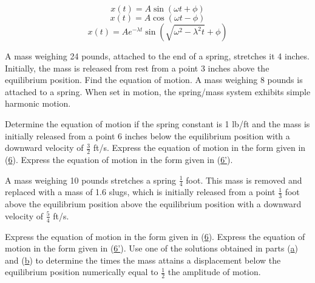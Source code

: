 \documentclass[chapter=5,section=1]{math252homework}
\begin{document}
\renewcommand\theequation{\arabic{equation}}
\setcounter{equation}{5}
\begin{equation} x(t) = A\sin(\omega t + \phi)\label{eq:6}\end{equation}
\renewcommand\theequation{\arabic{equation}'}
\setcounter{equation}{5}
\begin{equation} x(t) = A\cos(\omega t - \phi) \label{eq:6'}\end{equation}
\renewcommand\theequation{\arabic{equation}}
\setcounter{equation}{22}
\begin{equation} x(t) = Ae^{-\lambda t}\sin\left( \sqrt{\omega^{2} - \lambda^{2}t} + \phi \right) \label{eq:23}\end{equation}

\begin{problems}[start=3]
	\problem A mass weighing 24 pounds, attached to the end of a spring, stretches it 4 inches. Initially, the mass is released from rest from a point 3 inches above the equilibrium position. Find the equation of motion.
	\setcounter{problemsi}{8}
	\problem A mass weighing 8 pounds is attached to a spring. When set in motion, the spring/mass system exhibits simple harmonic motion.
	\begin{problems}
	    \subproblem Determine the equation of motion if the spring constant is 1 lb/ft and the mass is initially released from a point 6 inches below the equilibrium position with a downward velocity of $\frac{3}{2}$ ft/s.
		\subproblem Express the equation of motion in the form given in (\hyperref[eq:6]{6}).
		\subproblem Express the equation of motion in the form given in (\hyperref[eq:6']{6'}).
	\end{problems}
	\problem A mass weighing 10 pounds stretches a spring $\frac{1}{4}$ foot. This mass is removed and replaced with a mass of 1.6 slugs, which is initially released from a point $\frac{1}{3}$ foot above the equilibrium position above the equilibrium position with a downward velocity of $\frac{5}{4}$ ft/s.
	\begin{problems}
	    \subproblem Express the equation of motion in the form given in (\hyperref[eq:6]{6}).
	    \subproblem Express the equation of motion in the form given in (\hyperref[eq:6']{6'}).
		\subproblem Use one of the solutions obtained in parts (\hyperref[prb:10a]{a}) and (\hyperref[prb:10b]{b}) to determine the times the mass attains a displacement below the equilibrium position numerically equal to $\frac{1}{2}$ the amplitude of motion.
	\end{problems}

\end{problems}
\end{document}
